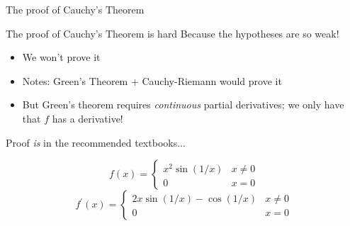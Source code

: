 \documentclass{beamer}
\begin{document}
\begin{frame}{The proof of Cauchy's Theorem}
\begin{block}{The proof of Cauchy's Theorem is hard}
Because the hypotheses are so weak!
\begin{itemize}
    \item We won't prove it
    \item Notes: Green's Theorem + Cauchy-Riemann would prove it
    \item But Green's theorem requires \emph{continuous} partial derivatives; we only have that $f$ has a derivative!
\end{itemize}
Proof \emph{is} in the recommended textbooks...
\end{block}
\begin{example}
$$f(x)=\begin{cases}x^2\sin(1/x) & x\neq 0\\0 & x=0 \end{cases}$$
$$f^\prime(x)=\begin{cases}2x\sin(1/x)-\cos(1/x) & x\neq 0\\0 & x=0 \end{cases}$$
\end{example}

\end{frame}
\end{document}
